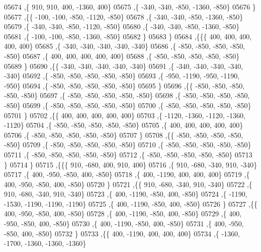 \begin{DoxyCode}
05674     ,\{   910,   910,   400, -1360,   400\}
05675     ,\{  -340,  -340,  -850, -1360,  -850\}
05676     \}
05677    ,\{\{  -100,  -100,  -850, -1120,  -850\}
05678     ,\{  -340,  -340,  -850, -1360,  -850\}
05679     ,\{  -340,  -340,  -850, -1120,  -850\}
05680     ,\{  -340,  -340,  -850, -1360,  -850\}
05681     ,\{  -100,  -100,  -850, -1360,  -850\}
05682     \}
05683    \}
05684   ,\{\{\{   400,   400,   400,   400,   400\}
05685     ,\{  -340,  -340,  -340,  -340,  -340\}
05686     ,\{  -850,  -850,  -850,  -850,  -850\}
05687     ,\{   400,   400,   400,   400,   400\}
05688     ,\{  -850,  -850,  -850,  -850,  -850\}
05689     \}
05690    ,\{\{  -340,  -340,  -340,  -340,  -340\}
05691     ,\{  -340,  -340,  -340,  -340,  -340\}
05692     ,\{  -850,  -850,  -850,  -850,  -850\}
05693     ,\{  -950, -1190,  -950, -1190,  -950\}
05694     ,\{  -850,  -850,  -850,  -850,  -850\}
05695     \}
05696    ,\{\{  -850,  -850,  -850,  -850,  -850\}
05697     ,\{  -850,  -850,  -850,  -850,  -850\}
05698     ,\{  -850,  -850,  -850,  -850,  -850\}
05699     ,\{  -850,  -850,  -850,  -850,  -850\}
05700     ,\{  -850,  -850,  -850,  -850,  -850\}
05701     \}
05702    ,\{\{   400,   400,   400,   400,   400\}
05703     ,\{ -1120, -1360, -1120, -1360, -1120\}
05704     ,\{  -850,  -850,  -850,  -850,  -850\}
05705     ,\{   400,   400,   400,   400,   400\}
05706     ,\{  -850,  -850,  -850,  -850,  -850\}
05707     \}
05708    ,\{\{  -850,  -850,  -850,  -850,  -850\}
05709     ,\{  -850,  -850,  -850,  -850,  -850\}
05710     ,\{  -850,  -850,  -850,  -850,  -850\}
05711     ,\{  -850,  -850,  -850,  -850,  -850\}
05712     ,\{  -850,  -850,  -850,  -850,  -850\}
05713     \}
05714    \}
05715   ,\{\{\{   910,  -680,   400,   910,   400\}
05716     ,\{   910,  -680,  -340,   910,  -340\}
05717     ,\{   400,  -950,  -850,   400,  -850\}
05718     ,\{   400, -1190,   400,   400,   400\}
05719     ,\{   400,  -950,  -850,   400,  -850\}
05720     \}
05721    ,\{\{   910,  -680,  -340,   910,  -340\}
05722     ,\{   910,  -680,  -340,   910,  -340\}
05723     ,\{   400, -1190,  -850,   400,  -850\}
05724     ,\{ -1190, -1530, -1190, -1190, -1190\}
05725     ,\{   400, -1190,  -850,   400,  -850\}
05726     \}
05727    ,\{\{   400,  -950,  -850,   400,  -850\}
05728     ,\{   400, -1190,  -850,   400,  -850\}
05729     ,\{   400,  -950,  -850,   400,  -850\}
05730     ,\{   400, -1190,  -850,   400,  -850\}
05731     ,\{   400,  -950,  -850,   400,  -850\}
05732     \}
05733    ,\{\{   400, -1190,   400,   400,   400\}
05734     ,\{ -1360, -1700, -1360, -1360, -1360\}

\end{DoxyCode}
